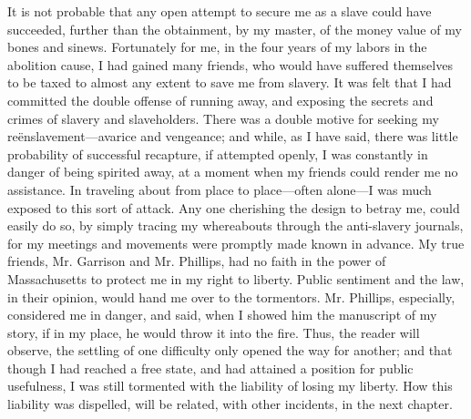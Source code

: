 It is not probable that any open attempt to secure me as a slave could
have succeeded, further than the obtainment, by my master, of the money
value of my bones and sinews. Fortunately for me, in the four years of
my labors in the abolition cause, I had gained many friends, who would
have suffered themselves to be taxed to almost any extent to save me
from slavery. It was felt that I had committed the double offense of
running away, and exposing the secrets and crimes of slavery and
slaveholders. There was a double motive for seeking my
reënslavement---avarice and vengeance; and while, as I have said, there
was little probability of successful recapture, if attempted openly, I
was constantly in danger of being spirited away, at a moment when my
friends could render me no assistance. In traveling about from place to
place---often alone---I was much exposed to this sort of attack. Any one
cherishing the {}design to betray me, could easily do so, by simply
tracing my whereabouts through the anti-slavery journals, for my
meetings and movements were promptly made known in advance. My true
friends, Mr. Garrison and Mr. Phillips, had no faith in the power of
Massachusetts to protect me in my right to liberty. Public sentiment and
the law, in their opinion, would hand me over to the tormentors. Mr.
Phillips, especially, considered me in danger, and said, when I showed
him the manuscript of my story, if in my place, he would throw it into
the fire. Thus, the reader will observe, the settling of one difficulty
only opened the way for another; and that though I had reached a free
state, and had attained a position for public usefulness, I was still
tormented with the liability of losing my liberty. How this liability
was dispelled, will be related, with other incidents, in the next
chapter.
